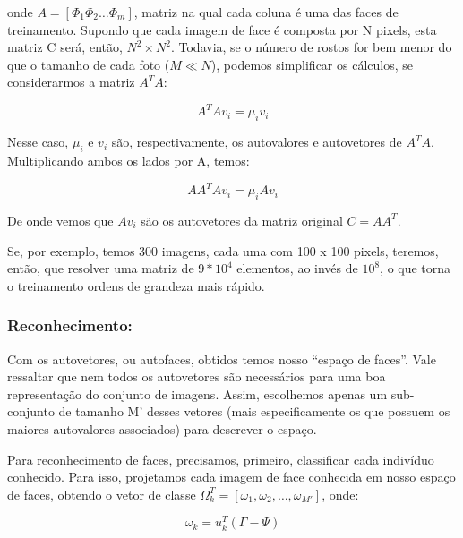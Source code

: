 \documentclass[10pt,a4paper]{article}
\begin{document}
onde $A = [ \Phi_1 \Phi_2 \ldots \Phi_m ]$, matriz na qual cada coluna
é uma das faces de treinamento. Supondo que cada imagem de face é
composta por N pixels, esta matriz C será, então, $N^2 \times
N^2$. Todavia, se o número de rostos for bem menor do que o tamanho de
cada foto ($M \ll N$), podemos simplificar os cálculos, se
considerarmos a matriz $A^TA$:

\begin{equation}
  A^TAv_i=\mu_iv_i
\end{equation}


Nesse caso, $\mu_i$ e $v_i$ são, respectivamente, os autovalores e
autovetores de $A^TA$. Multiplicando ambos os lados por A, temos:

\begin{equation}
  AA^TAv_i=\mu_iAv_i
\end{equation}


De onde vemos que $Av_i$ são os autovetores da matriz original $C = AA^T$.

Se, por exemplo, temos 300 imagens, cada uma com 100 x 100 pixels,
teremos, então, que resolver uma matriz de $9*10^4$ elementos, ao
invés de $10^8$, o que torna o treinamento ordens de grandeza mais rápido.


\subsubsection*{Reconhecimento:}

Com os autovetores, ou autofaces, obtidos temos nosso “espaço de
faces”. Vale ressaltar que nem todos os autovetores são necessários
para uma boa representação do conjunto de imagens. Assim, escolhemos
apenas um sub-conjunto de tamanho M’ desses vetores (mais
especificamente os que possuem os maiores autovalores associados) para
descrever o espaço.

Para reconhecimento de faces, precisamos, primeiro, classificar cada
indivíduo conhecido. Para isso, projetamos cada imagem de face
conhecida em nosso espaço de faces, obtendo o vetor de classe
$\Omega_k^T = [ \omega_1, \omega_2, \ldots,\omega_{M'} ]$, onde:



\begin{equation}
  \omega_k=u_k^T(\Gamma-\Psi)
\end{equation}
\end{document}
